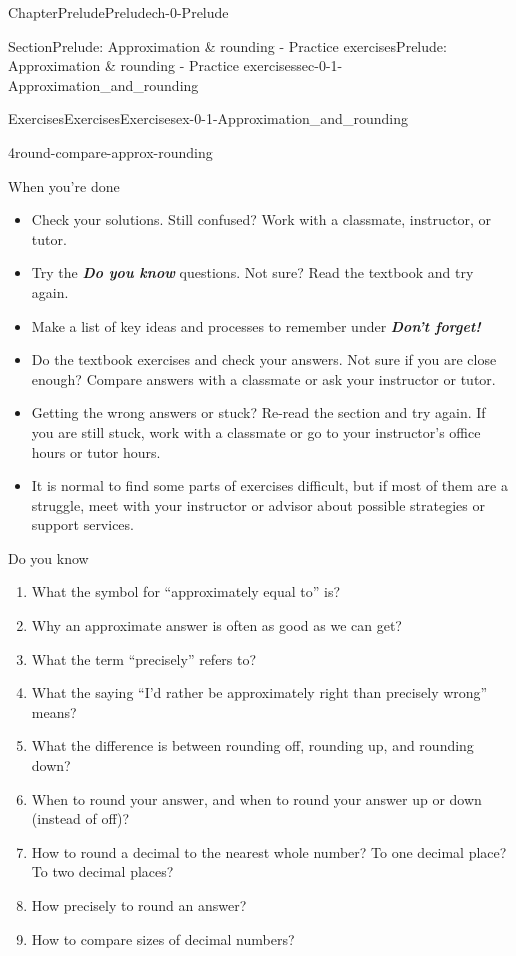 \documentclass[twoside,11pt,]{book}
\newcommand{\alert}[1]{\textbf{\textit{#1}}}
\numberwithin{equation}{section}
\begin{document}
\begin{chapterptx}{Chapter}{Prelude}{}{Prelude}{}{}{ch-0-Prelude}
\begin{sectionptx}{Section}{Prelude: Approximation \& rounding - Practice exercises}{}{Prelude: Approximation \& rounding - Practice exercises}{}{}{sec-0-1-Approximation_and_rounding}
\begin{exercises-subsection-numberless}{Exercises}{Exercises}{}{Exercises}{}{}{ex-0-1-Approximation_and_rounding}
\begin{divisionexercise}{4}{}{}{round-compare-approx-rounding}
\begin{enumerate}[label=(\alph*),ref=\alph*]
\end{enumerate}%
\end{divisionexercise}%
\end{exercises-subsection-numberless}
\begin{conclusion}{When you're done \textellipsis{}}%
%
\begin{itemize}[label=\textbullet]
\item{}Check your solutions. Still confused? Work with a classmate, instructor, or tutor.%
\item{}Try the \alert{Do you know} questions. Not sure? Read the textbook and try again.%
\item{}Make a list of key ideas and processes to remember under \alert{Don't forget!}%
\item{}Do the textbook exercises and check your answers. Not sure if you are close enough? Compare answers with a classmate or ask your instructor or tutor.%
\item{}Getting the wrong answers or stuck? Re-read the section and try again. If you are still stuck, work with a classmate or go to your instructor's office hours or tutor hours.%
\item{}It is normal to find some parts of exercises difficult, but if most of them are a struggle, meet with your instructor or advisor about possible strategies or support services.%
\end{itemize}
%
\end{conclusion}%
\begin{conclusion}{Do you know \textellipsis{}}%
%
\begin{enumerate}[label={\Alph*.}]
\item{}What the symbol for ``approximately equal to'' is?%
\item{}Why an approximate answer is often as good as we can get?%
\item{}What the term ``precisely'' refers to?%
\item{}What the saying ``I'd rather be approximately right than precisely wrong'' means?%
\item{}What the difference is between rounding off, rounding up, and rounding down?%
\item{}When to round your answer, and when to round your answer up or down (instead of off)?%
\item{}How to round a decimal to the nearest whole number? To one decimal place? To two decimal places?%
\item{}How precisely to round an answer?%
\item{}How to compare sizes of decimal numbers?%

\end{enumerate}
\end{conclusion}
\end{sectionptx}
\end{chapterptx}
\end{document}
